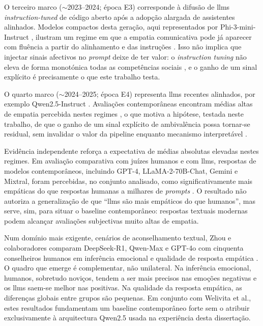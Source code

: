 O terceiro marco (\(\sim\)2023--2024; época E3) corresponde à difusão de \glspl{llm} \textit{instruction-tuned} de código aberto após a adopção alargada de assistentes alinhados. Modelos compactos desta geração, aqui representados por Phi-3-mini-Instruct \parencite{Abdin2024Phi3}, ilustram um regime em que a empatia comunicativa pode já aparecer com fluência a partir do alinhamento e das instruções \parencite{Welivita2026HumansOrLLMs, Ye2025GenericPersonalized}. Isso não implica que injectar sinais afectivos no \textit{prompt} deixe de ter valor: o \textit{instruction tuning} não eleva de forma monotónica todas as competências sociais \parencite{Ou2024DialogBench}, e o ganho de um sinal explícito é precisamente o que este trabalho testa.

O quarto marco (\(\sim\)2024--2025; época E4) representa \glspl{llm} recentes alinhados, por exemplo Qwen2.5-Instruct \parencite{Yang2025Qwen25}. Avaliações contemporâneas encontram médias altas de empatia percebida nestes regimes \parencite{Welivita2026HumansOrLLMs, Zhou2026TextEmotionEmpathy}, o que motiva a hipótese, testada neste trabalho, de que o ganho de um sinal explícito de ambivalência possa tornar-se residual, sem invalidar o valor da pipeline enquanto mecanismo interpretável \parencite{Bieberstein2026PromptEmpathy}.

Evidência independente reforça a expectativa de médias absolutas elevadas nestes regimes. Em avaliação comparativa com juízes humanos e com \glspl{llm}, respostas de modelos contemporâneos, incluindo GPT-4, LLaMA-2-70B-Chat, Gemini e Mixtral, foram percebidas, no conjunto analisado, como significativamente mais empáticas do que respostas humanas a milhares de \textit{prompts} \parencite{Welivita2026HumansOrLLMs}. O resultado não autoriza a generalização de que ``\glspl{llm} são mais empáticos do que humanos'', mas serve, sim, para situar o baseline contemporâneo: respostas textuais modernas podem alcançar avaliações subjectivas muito altas de empatia.

Num domínio mais exigente, cenários de aconselhamento textual, Zhou e colaboradores comparam DeepSeek-R1, Qwen-Max e GPT-4o com cinquenta conselheiros humanos em inferência emocional e qualidade de resposta empática \parencite{Zhou2026TextEmotionEmpathy}. O quadro que emerge é complementar, não unilateral. Na inferência emocional, humanos, sobretudo noviços, tendem a ser mais precisos nas emoções negativas e os \glspl{llm} saem-se melhor nas positivas. Na qualidade da resposta empática, as diferenças globais entre grupos são pequenas. Em conjunto com Welivita et al., estes resultados fundamentam um baseline contemporâneo forte sem o atribuir exclusivamente à arquitectura Qwen2.5 usada na experiência desta dissertação.

